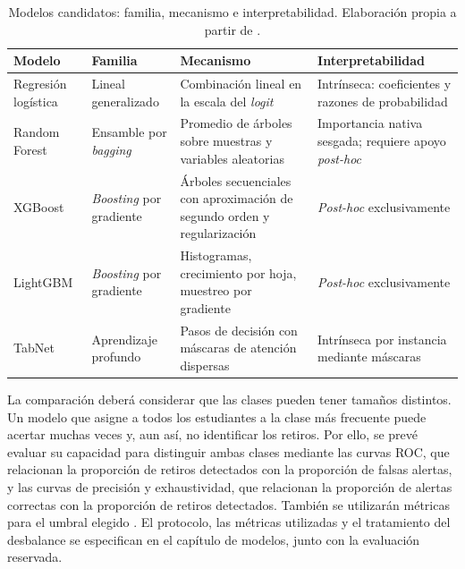 \begin{table}[htbp]
\centering
\caption[Modelos candidatos: familia, mecanismo e interpretabilidad.]{Modelos candidatos: familia, mecanismo e interpretabilidad. Elaboración propia a partir de \cite{hosmer2013,breiman2001,chen2016,ke2017,arXiv190807442}.}
\label{tab:modelos-candidatos}
\small
\begin{tabular}{p{} p{} p{} p{}}
\hline
\textbf{Modelo} & \textbf{Familia} & \textbf{Mecanismo} & \textbf{Interpretabilidad} \\
\hline
Regresión logística & Lineal generalizado & Combinación lineal en la escala del \textit{logit} & Intrínseca: coeficientes y razones de probabilidad \\
Random Forest & Ensamble por \textit{bagging} & Promedio de árboles sobre muestras y variables aleatorias & Importancia nativa sesgada; requiere apoyo \textit{post-hoc} \\
XGBoost & \textit{Boosting} por gradiente & Árboles secuenciales con aproximación de segundo orden y regularización & \textit{Post-hoc} exclusivamente \\
LightGBM & \textit{Boosting} por gradiente & Histogramas, crecimiento por hoja, muestreo por gradiente & \textit{Post-hoc} exclusivamente \\
TabNet & Aprendizaje profundo & Pasos de decisión con máscaras de atención dispersas & Intrínseca por instancia mediante máscaras \\
\hline
\end{tabular}
\end{table}

La comparación deberá considerar que las clases pueden tener tamaños distintos. Un modelo que asigne a todos los estudiantes a la clase más frecuente puede acertar muchas veces y, aun así, no identificar los retiros. Por ello, se prevé evaluar su capacidad para distinguir ambas clases mediante las curvas ROC, que relacionan la proporción de retiros detectados con la proporción de falsas alertas, y las curvas de precisión y exhaustividad, que relacionan la proporción de alertas correctas con la proporción de retiros detectados. También se utilizarán métricas para el umbral elegido \cite{1049482020222124425,s41598025939181}. El protocolo, las métricas utilizadas y el tratamiento del desbalance se especifican en el capítulo de modelos, junto con la evaluación reservada.


